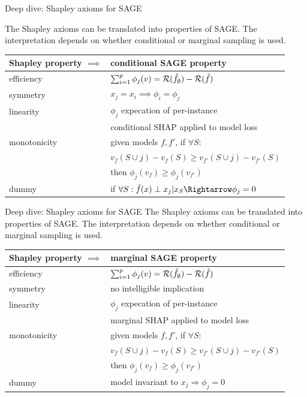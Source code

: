 \documentclass[11pt,compress,t,notes=noshow, aspectratio=169, xcolor=table]{beamer}
\begin{document}

\begin{frame}{Deep dive: Shapley axioms for SAGE}

The Shapley axioms can be translated into properties of SAGE. The interpretation depends on whether conditional or marginal sampling is used.
%
\begin{table}
  \centering
  \begin{tabular}{l | l }
  Shapley property $\implies$ & conditional SAGE property \\
  \hline
  efficiency & $\sum_{i=1}^p \phi_j(v) = \risk(\fh_\emptyset) - \risk(\fh)$\\
  symmetry & $x_j = x_i \implies \phi_i = \phi_j$ \\
  linearity & $\phi_j$ expecation of per-instance\\
  & conditional SHAP applied to model loss\\
  monotonicity & given models $f, f'$, if  $\forall S:$\\
  &$v_f(S \cup j) - v_f(S) \geq v_{f'}(S \cup j) - v_{f'}(S)$ \\
  &then $\phi_j(v_f) \geq \phi_j(v_{f'})$\\
  dummy & if $\forall S: \fh(x) \indep x_j | x_S \Rightarrow \phi_j = 0$
  \end{tabular}
\end{table}

\end{frame}

\begin{frame}{Deep dive: Shapley axioms for SAGE}
%
The Shapley axioms can be translated into properties of SAGE. The interpretation depends on whether conditional or marginal sampling is used.
%
\begin{table}
  \centering
  \begin{tabular}{l | l }
  Shapley property $\implies$ & marginal SAGE property \\
  \hline
  efficiency & $\sum_{i=1}^p \phi_j(v) = \risk(\fh_\emptyset) - \risk(\fh)$\\
  symmetry & no intelligible implication \\
  linearity & $\phi_j$ expecation of per-instance\\
  & marginal SHAP applied to model loss\\
  monotonicity & given models $f, f'$, if  $\forall S:$\\
  &$v_f(S \cup j) - v_f(S) \geq v_{f'}(S \cup j) - v_{f'}(S)$ \\
  &then $\phi_j(v_f) \geq \phi_j(v_{f'})$\\
  dummy & model invariant to $x_j \Rightarrow \phi_j = 0$\\
  \end{tabular}
\end{table}
%
\end{frame}

\endlecture
\end{document}
